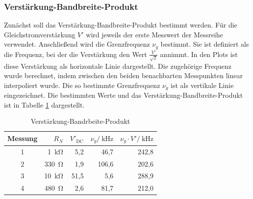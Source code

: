 \subsubsection{Verstärkung-Bandbreite-Produkt}
Zunächst soll das Verstärkung-Bandbreite-Produkt bestimmt werden.
Für die Gleichstromverstärkung $V'$ wird jeweils der erste Messwert der Messreihe verwendet.
Anschließend wird die Grenzfrequenz $\nu_g$ bestimmt.
Sie ist definiert als die Frequenz, bei der die Verstärkung den Wert $\frac{V'}{\sqrt{2}}$ annimmt.
In den Plots ist diese Verstärkung als horizontale Linie dargestellt.
Die zugehörige Frequenz wurde berechnet, indem zwischen den beiden benachbarten Messpunkten linear interpoliert wurde.
Die so bestimmte Grenzfrequenz $\nu_g$ ist als vertikale Linie eingezeichnet.
Die bestimmten Werte und das Verstärkung-Bandbreite-Produkt ist in Tabelle \ref{tab:vbp} dargestellt.

\begin{table}
	\centering
	\begin{tabular}{c r r r r}
		\toprule
		Messung & $R_N$ & $V'_\text{DC}$ & $\nu_g / \SI{}{\kilo \hertz}$ & $\nu_g \cdot V' / \SI{}{\kilo \hertz}$ \\
		\midrule
		1 & \SI{1}{\kilo \ohm} & 5,2 & 46,7 & 242,8 \\
		2 & \SI{330}{\ohm} & 1,9 & 106,6 & 202,6 \\
		3 & \SI{10}{\kilo \ohm} & 51,5 & 5,6 & 288,9 \\
		4 & \SI{480}{\ohm} & 2,6 & 81,7 & 212,0 \\
		\bottomrule
	\end{tabular}
	\caption{Verstärkung-Bandrbeite-Produkt}
	\label{tab:vbp}
\end{table}

